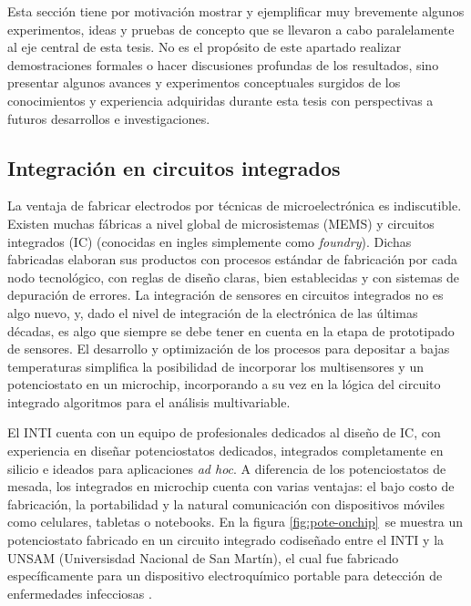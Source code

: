  		Esta sección tiene por motivación mostrar y ejemplificar muy brevemente algunos experimentos, ideas y pruebas de concepto que se llevaron a cabo paralelamente al eje central de esta tesis. No es el propósito de este apartado realizar demostraciones formales o hacer discusiones profundas de los resultados, sino presentar algunos avances y experimentos conceptuales surgidos de los conocimientos y experiencia adquiridas durante esta tesis con perspectivas a futuros desarrollos e investigaciones.

  
  \subsection{Integración en circuitos integrados}

	  La ventaja de fabricar electrodos por técnicas de microelectrónica es indiscutible. Existen muchas fábricas a nivel global de microsistemas (MEMS) y circuitos integrados (IC) (conocidas en ingles simplemente como \textit{foundry}). Dichas fabricadas elaboran sus productos con procesos estándar de fabricación por cada nodo tecnológico, con reglas de diseño claras, bien establecidas y con sistemas de depuración de errores. La integración de sensores en circuitos integrados no es algo nuevo, y, dado el nivel de integración de la electrónica de las últimas décadas, es algo que siempre se debe tener en cuenta en la etapa de prototipado de sensores.\cite{Wang2012,Liu1993,Novell2012,Yu2013,Sarkar2014} El desarrollo y optimización de los procesos para depositar \pdm\space a bajas temperaturas simplifica la posibilidad de incorporar los multisensores y un potenciostato en un microchip, incorporando a su vez en la lógica del circuito integrado algoritmos para el análisis multivariable.

	  El INTI cuenta con un equipo de profesionales dedicados al diseño de IC, con experiencia en diseñar potenciostatos dedicados, integrados completamente en silicio e ideados para aplicaciones \textit{ad hoc}\cite{sanmartin2011}. A diferencia de los potenciostatos de mesada, los integrados en microchip cuenta con varias ventajas: el bajo costo de fabricación, la portabilidad y la natural comunicación con dispositivos móviles como celulares, tabletas o notebooks.\cite{longinotti2010,Salomon2014} En la figura \ref{fig:pote-onchip} se muestra un potenciostato fabricado en un circuito integrado codiseñado entre el INTI y la UNSAM (Universisdad Nacional de San Martín), el cual fue fabricado específicamente para un dispositivo electroquímico portable para detección de enfermedades infecciosas \cite{Kuo2018}.	 
 			
